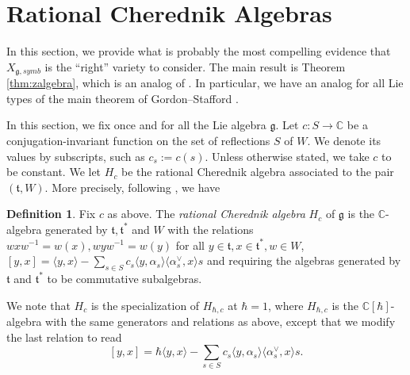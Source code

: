 \documentclass{amsart}
\numberwithin{equation}{section}
\theoremstyle{definition}
\newtheorem{definition}[lemma]{Definition}%
\newcommand{\fg}{\mathfrak{g}}
\newcommand{\ft}{\mathfrak{t}}
\newcommand{\C}{{\mathbb C}}
\begin{document}
\section{Rational Cherednik Algebras}
\label{sec:cherednik}
In this section, we provide what is probably the most compelling evidence that $X_{\fg,symb}$ is the ``right'' variety to consider. The main result is Theorem \ref{thm:zalgebra}, which is an analog of \cite[Proposition 1.7.]{GS1}. In particular, we have an analog for all Lie types of the main theorem of Gordon--Stafford \cite[Theorem 1.4.]{GS1}.

In this section, we fix once and for all the Lie algebra $\fg$.
Let $c: S\to \C$ be a conjugation-invariant function on the set of reflections $S$ of $W$. We denote its values by subscripts, such as $c_s:=c(s)$. Unless otherwise stated, we take $c$ to be constant. We let $H_c$ be the rational Cherednik algebra associated to the pair $(\ft,W)$. More precisely, following \cite{BEG}, we have
\begin{definition}
Fix $c$ as above. The {\em rational Cherednik algebra} $H_c$ of $\fg$ is the $\C$-algebra generated by 
$\ft, \ft^*$ and $W$ with the relations $wxw^{-1}=w(x), wyw^{-1}=w(y)$ for all $y\in \ft, x\in \ft^*,w\in W$, $[y,x]=\langle y,x \rangle-\sum_{s\in S}c_s\langle y,\alpha_s\rangle\langle\alpha^\vee_s,x\rangle s$ and requiring the algebras generated by $\ft$ and $\ft^*$ to be commutative subalgebras.
\end{definition}

We note that $H_c$ is the specialization of $H_{\hbar, c}$ at $\hbar=1$, where $H_{\hbar,c}$ is the $\C[\hbar]$-algebra with the same generators and relations as above, except that we modify the last relation to read $$[y,x]=\hbar\langle y,x \rangle-\sum_{s\in S}c_s\langle y,\alpha_s\rangle\langle\alpha^\vee_s,x\rangle s.$$
\end{document}
